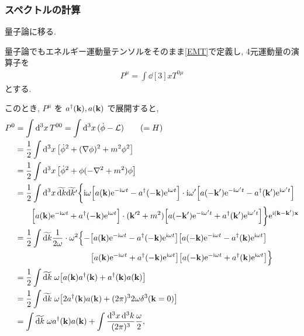 \documentclass[../note01.tex]{subfiles}
\begin{document}
\subsubsection{スペクトルの計算}
量子論に移る.
\begin{katei}
    量子論でもエネルギー運動量テンソルをそのまま\eqref{EMT}で定義し, 4元運動量の演算子を
    \begin{align}
        P^\mu = \int\dd[3]{x}T^{0\mu}
    \end{align}
    とする.
\end{katei}
\noindent このとき, $ P^\mu $ を $ a^\dagger(\vb{k}),a(\vb{k}) $ で展開すると,
\begin{align*}
    P^0 &= \int\dd[3]{x} T^{00} = \int\dd[3]{x} (\dot{\phi}-\mathcal{L}) \qquad (= H) \\
    &= \frac{1}{2}\int\dd[3]{x} \qty[\dot{\phi}^2 + (\nabla\phi)^2 + m^2\phi^2] \\
    &= \frac{1}{2}\int\dd[3]{x} \qty[\dot{\phi}^2 + \phi(-\nabla^2+m^2)\phi] \\
    &= \frac{1}{2}\int\dd[3]{x}\widetilde{\dd{k}}\widetilde{\dd{k'}} \biggl\{\I\omega\Bigl[a(\vb{k})\E^{-\I\omega t} - a^\dagger(-\vb{k})\E^{\I\omega t}\Bigr] \cdot \I\omega'\qty[a(-\vb{k}')\E^{-\I\omega't} - a^\dagger(\vb{k}')\E^{\I\omega't}] \\
    &\qquad \Bigl[a(\vb{k})\E^{-\I\omega t} + a^\dagger(-\vb{k})\E^{\I\omega t}\Bigr] \cdot (\vb{k}'^2+m^2) \qty[a(-\vb{k}')\E^{-\I\omega't} + a^\dagger(\vb{k}')\E^{\I\omega't}]\biggr\} \E^{\I(\vb{k}-\vb{k}')\vb{x}} \\
    &= \frac{1}{2}\int\widetilde{\dd{k}}\frac{1}{2\omega} \cdot \omega^2 \Bigl\{-\qty[a(\vb{k})\E^{-\I\omega t} - a^\dagger(-\vb{k})\E^{\I\omega t}] \qty[a(-\vb{k})\E^{-\I\omega t} - a^\dagger(\vb{k})\E^{\I\omega t}] \\
    &\hspace{32.5mm} \qty[a(\vb{k})\E^{-\I\omega t} + a^\dagger(-\vb{k})\E^{\I\omega t}] \qty[a(-\vb{k})\E^{-\I\omega t} + a^\dagger(\vb{k})\E^{\I\omega t}]\Bigr\} \\
    &= \frac{1}{2}\int\widetilde{\dd{k}}\; \omega \qty[a(\vb{k})a^\dagger(\vb{k}) + a^\dagger(\vb{k})a(\vb{k})] \\
    &= \frac{1}{2}\int\widetilde{\dd{k}}\; \omega \qty[2a^\dagger(\vb{k})a(\vb{k}) + (2\pi)^3 2\omega\delta^3(\vb{k}=0)] \\
    &= \int\widetilde{\dd{k}}\; \omega a^\dagger(\vb{k})a(\vb{k}) + \int\frac{\dd[3]{x}\dd[3]{k}}{(2\pi)^3} \frac{\omega}{2}, \\

\end{align*}
\end{document}
